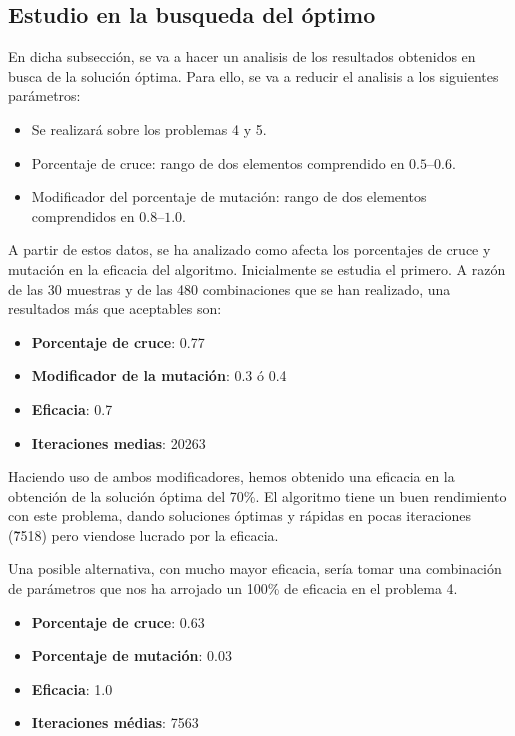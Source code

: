 \documentclass[runningheads]{llncs}
\begin{document}
\subsection{Estudio en la busqueda del óptimo}\label{sec:opt}
En dicha subsección, se va a hacer un analisis de los resultados obtenidos en busca de la solución óptima. Para ello, se va a reducir el analisis a los siguientes parámetros:
\begin{itemize}
	\item Se realizará sobre los problemas 4 y 5.
	\item Porcentaje de cruce: rango de dos elementos comprendido en $\numrange[range-phrase = --]{0.5}{0.6}$.
	\item Modificador del porcentaje de mutación: rango de dos elementos comprendidos en $\numrange[range-phrase = --]{0.8}{1.0}$.
\end{itemize}

\noindent
A partir de estos datos, se ha analizado como afecta los porcentajes de cruce y mutación en la eficacia del algoritmo. Inicialmente se estudia el primero.
A razón de las 30 muestras y de las 480 combinaciones que se han realizado, una resultados más que aceptables son:
\begin{itemize}
	\item \textbf{Porcentaje de cruce}: 0.77
	\item \textbf{Modificador de la mutación}: 0.3 ó 0.4
	\item \textbf{Eficacia}: 0.7
	\item \textbf{Iteraciones medias}: 20263
\end{itemize}

\noindent
Haciendo uso de ambos modificadores, hemos obtenido una eficacia en la obtención de la solución óptima del 70\%. El algoritmo tiene un buen rendimiento con este problema,
dando soluciones óptimas y rápidas en pocas iteraciones (\~7518) pero viendose lucrado por la eficacia.

\noindent
Una posible alternativa, con mucho mayor eficacia, sería tomar una combinación de parámetros que nos ha arrojado un 100\% de eficacia en el problema 4.
\begin{itemize}
	\item \textbf{Porcentaje de cruce}: 0.63
	\item \textbf{Porcentaje de mutación}: 0.03
	\item \textbf{Eficacia}: 1.0
	\item \textbf{Iteraciones médias}: 7563
\end{itemize}
\end{document}
